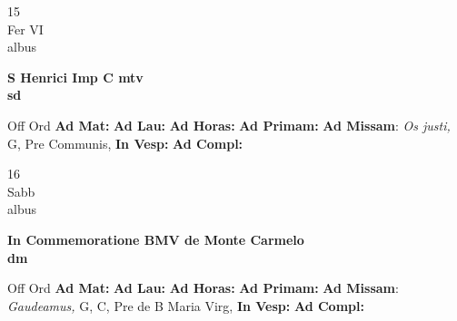 \documentclass[10pt, openany]{book}
\begin{document}
        \begin{center}
            \begin{minipage}{3.5in}
                \vspace{2em}
                \begin{minipage}{0.5in}
                    {\Huge 15} \\
                    {\normalsize Fer VI} \\
                    {\normalsize albus}
                \end{minipage}
                \begin{minipage}{3.0in}
                    \textbf{ \large S Henrici Imp C mtv \\
                    \textnormal{\normalsize sd}} \\ 
                \end{minipage}
                \begin{justify}Off Ord
                    \textbf{Ad Mat: }
                    \textbf{Ad Lau: }
                    \textbf{Ad Horas: }
                    \textbf{Ad Primam: }\textbf{Ad Missam}: \textit{Os justi,} G, Pre Communis,  
                    \textbf{In Vesp: }
                    \textbf{Ad Compl: }
                \end{justify}
            \end{minipage}
        \end{center}
    
        \begin{center}
            \begin{minipage}{3.5in}
                \vspace{2em}
                \begin{minipage}{0.5in}
                    {\Huge 16} \\
                    {\normalsize Sabb} \\
                    {\normalsize albus}
                \end{minipage}
                \begin{minipage}{3.0in}
                    \textbf{ \large In Commemoratione BMV de Monte Carmelo \\
                    \textnormal{\normalsize dm}} \\ 
                \end{minipage}
                \begin{justify}Off Ord
                    \textbf{Ad Mat: }
                    \textbf{Ad Lau: }
                    \textbf{Ad Horas: }
                    \textbf{Ad Primam: }\textbf{Ad Missam}: \textit{Gaudeamus,} G, C, Pre  de B Maria Virg,  
                    \textbf{In Vesp: }
                    \textbf{Ad Compl: }
                \end{justify}
            \end{minipage}
        \end{center}
    
\end{document}
